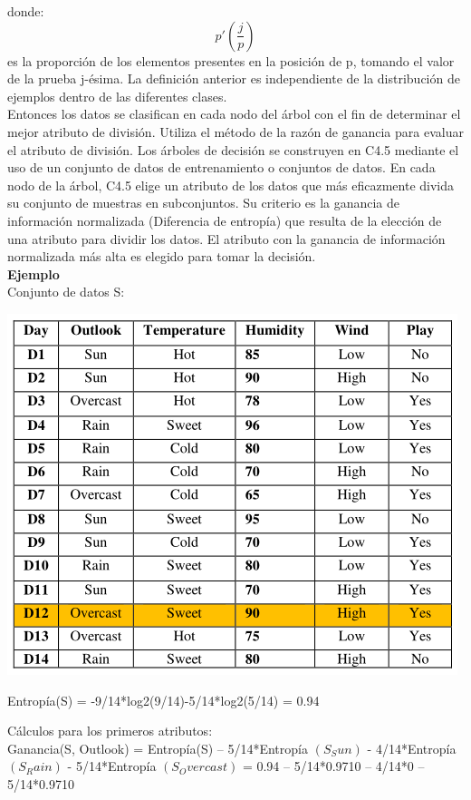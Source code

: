 \documentclass{article}
\begin{document}
donde: $$ p'(\frac{j}{p})$$ 
es la proporción de los elementos presentes en la posición de p, tomando el valor de la prueba j-ésima. La definición anterior es independiente de la distribución de ejemplos dentro de las diferentes clases.\\
Entonces los datos se clasifican en cada nodo del árbol con el fin de determinar el mejor atributo de división. Utiliza el método de la razón de ganancia para evaluar el atributo de división.
Los árboles de decisión se construyen en C4.5 mediante el uso de un conjunto de datos de entrenamiento o conjuntos de datos. En cada nodo de la árbol, C4.5 elige un atributo de los datos que más eficazmente divida su conjunto de muestras en subconjuntos.  Su criterio es la ganancia de información normalizada (Diferencia de entropía) que resulta de la elección de una atributo para dividir los datos. El atributo con la ganancia de información normalizada más alta es elegido para tomar la decisión.\\
 
 {\bf Ejemplo}\\
 Conjunto de datos S:
\begin{center}
 \includegraphics[scale=0.65]{conjunto}\\
\end{center}

Entropía(S) = -9/14*log2(9/14)-5/14*log2(5/14) = 0.94

Cálculos para los primeros atributos:\\
Ganancia(S, Outlook) = Entropía(S) – 5/14*Entropía $(S_Sun)$
					- 4/14*Entropía $(S_Rain)$
					- 5/14*Entropía $(S_Overcast)$	
					= 0.94 – 5/14*0.9710 – 4/14*0 – 5/14*0.9710
			
\end{document}
